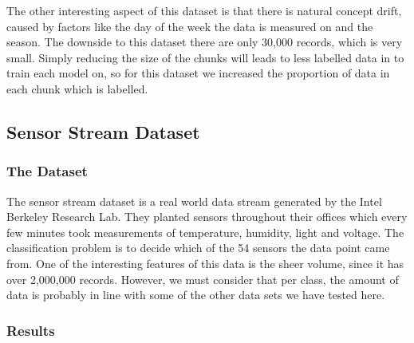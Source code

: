 \documentclass[12pt,a4paper,oneside]{report}
\begin{document}
The other interesting aspect of this dataset is that there is natural concept drift, caused by factors like the  day of the week the data is measured on and the season. The downside to this dataset there are only 30,000 records, which is very small. Simply reducing the size of the chunks will leads to less labelled data in to train each model on, so for this dataset we increased the proportion of data in each chunk which is labelled. 

\subsection{Sensor Stream Dataset}
\subsubsection{The Dataset}
The sensor stream dataset is a real world data stream generated by the Intel Berkeley Research Lab. They planted sensors throughout their offices which every few minutes took measurements of temperature, humidity, light and voltage. The classification problem is to decide which of the 54 sensors the data point came from. One of the interesting features of this data is the sheer volume, since it has over 2,000,000 records. However, we must consider that per class, the amount of data is probably in line with some of the other data sets we have tested here.  

\subsubsection{Results}
\end{document}
